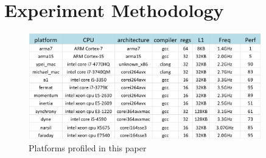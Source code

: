 \section{Experiment Methodology}
\label{sec:experiment}


\begin{figure}[tbhp]
  \centering
  \includegraphics[width=0.9\textwidth]{images/platforms.png}
  \caption{Platforms profiled in this paper}
  \label{fig:platforms}
\end{figure}
